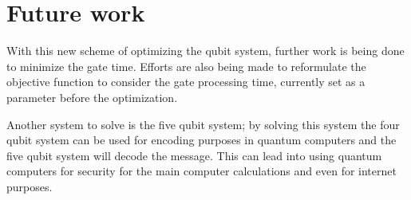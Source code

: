 \section{Future work}

With this new scheme of optimizing the qubit system, further work is being done to minimize the gate time. Efforts are also being made to reformulate the objective function to consider the gate processing time, currently set as a parameter before the optimization. 

Another system to solve is the five qubit system; by solving this system the four qubit system can be used for encoding purposes in quantum computers and the five qubit system will decode the message. This can lead into using quantum computers for security for the main computer calculations and even for internet purposes. 


